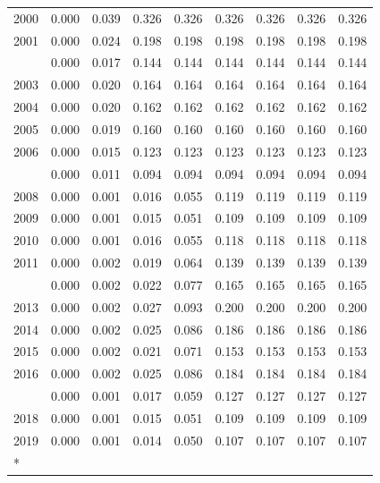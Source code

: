 \documentclass[
]{article}
\begin{document}
\begin{longtable}[t]{lrrrrrrrr}
2000 & 0.000 & 0.039 & 0.326 & 0.326 & 0.326 & 0.326 & 0.326 & 0.326\\
2001 & 0.000 & 0.024 & 0.198 & 0.198 & 0.198 & 0.198 & 0.198 & 0.198\\
\addlinespace
2002 & 0.000 & 0.017 & 0.144 & 0.144 & 0.144 & 0.144 & 0.144 & 0.144\\
2003 & 0.000 & 0.020 & 0.164 & 0.164 & 0.164 & 0.164 & 0.164 & 0.164\\
2004 & 0.000 & 0.020 & 0.162 & 0.162 & 0.162 & 0.162 & 0.162 & 0.162\\
2005 & 0.000 & 0.019 & 0.160 & 0.160 & 0.160 & 0.160 & 0.160 & 0.160\\
2006 & 0.000 & 0.015 & 0.123 & 0.123 & 0.123 & 0.123 & 0.123 & 0.123\\
\addlinespace
2007 & 0.000 & 0.011 & 0.094 & 0.094 & 0.094 & 0.094 & 0.094 & 0.094\\
2008 & 0.000 & 0.001 & 0.016 & 0.055 & 0.119 & 0.119 & 0.119 & 0.119\\
2009 & 0.000 & 0.001 & 0.015 & 0.051 & 0.109 & 0.109 & 0.109 & 0.109\\
2010 & 0.000 & 0.001 & 0.016 & 0.055 & 0.118 & 0.118 & 0.118 & 0.118\\
2011 & 0.000 & 0.002 & 0.019 & 0.064 & 0.139 & 0.139 & 0.139 & 0.139\\
\addlinespace
2012 & 0.000 & 0.002 & 0.022 & 0.077 & 0.165 & 0.165 & 0.165 & 0.165\\
2013 & 0.000 & 0.002 & 0.027 & 0.093 & 0.200 & 0.200 & 0.200 & 0.200\\
2014 & 0.000 & 0.002 & 0.025 & 0.086 & 0.186 & 0.186 & 0.186 & 0.186\\
2015 & 0.000 & 0.002 & 0.021 & 0.071 & 0.153 & 0.153 & 0.153 & 0.153\\
2016 & 0.000 & 0.002 & 0.025 & 0.086 & 0.184 & 0.184 & 0.184 & 0.184\\
\addlinespace
2017 & 0.000 & 0.001 & 0.017 & 0.059 & 0.127 & 0.127 & 0.127 & 0.127\\
2018 & 0.000 & 0.001 & 0.015 & 0.051 & 0.109 & 0.109 & 0.109 & 0.109\\
2019 & 0.000 & 0.001 & 0.014 & 0.050 & 0.107 & 0.107 & 0.107 & 0.107\\*
\end{longtable}
\end{document}

